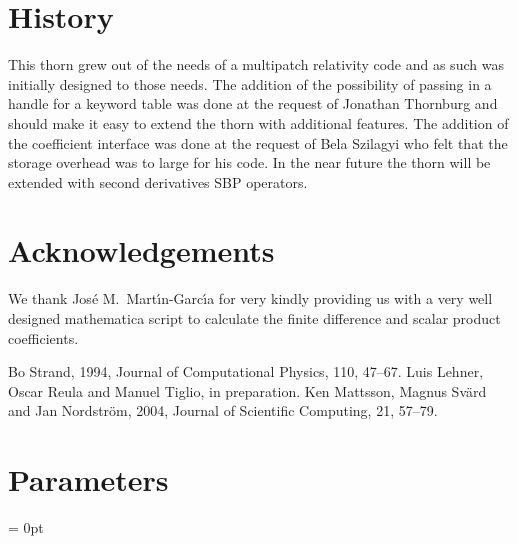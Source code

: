 \section{History}
This thorn grew out of the needs of a multipatch relativity code and as
such was initially designed to those needs. The addition of the possibility
of passing in a handle for a keyword table was done at the request of
Jonathan Thornburg and should make it easy to extend the thorn with
additional features. The addition of the coefficient interface was done
at the request of Bela Szilagyi who felt that the storage overhead was
to large for his code. In the near future the thorn will be extended with
second derivatives SBP operators.

%

\section{Acknowledgements}
We thank Jos\'{e} M.\ Mart\'{\i}n-Garc\'{\i}a for very kindly providing us
with a very well designed mathematica script to calculate the finite
difference and scalar product coefficients.

\begin{thebibliography}{9}
 Bo Strand, 1994, Journal of Computational Physics, 110,
47--67.
 Luis Lehner, Oscar Reula and Manuel Tiglio, in preparation.
 Ken Mattsson, Magnus Sv\"{a}rd and Jan Nordstr\"{o}m, 2004,
Journal of Scientific Computing, 21, 57--79.

\end{thebibliography}




\section{Parameters} 


\parskip = 0pt

\setlength{\tableWidth}{160mm}

\setlength{\paraWidth}{\tableWidth}
\setlength{\descWidth}{\tableWidth}
\settowidth{\maxVarWidth}{onesided\_interpatch\_boundaries}

